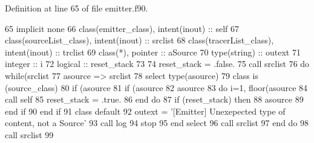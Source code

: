 Definition at line 65 of file emitter.\+f90.


\begin{DoxyCode}
65     \textcolor{keywordtype}{implicit none}
66     \textcolor{keywordtype}{class}(emitter\_class), \textcolor{keywordtype}{intent(inout)} :: self
67     \textcolor{keywordtype}{class}(sourceList\_class), \textcolor{keywordtype}{intent(inout)}  :: srclist
68     \textcolor{keywordtype}{class}(tracerList\_class), \textcolor{keywordtype}{intent(inout)}  :: trclist
69     \textcolor{keywordtype}{class}(*), \textcolor{keywordtype}{pointer} :: aSource
70     \textcolor{keywordtype}{type}(string) :: outext
71     \textcolor{keywordtype}{integer} :: i
72     \textcolor{keywordtype}{logical} :: reset\_stack
73 
74     reset\_stack = .false.
75     \textcolor{keyword}{call }srclist%
76     \textcolor{keywordflow}{do} \textcolor{keywordflow}{while}(srclist%
77         asource => srclist%
78         \textcolor{keywordflow}{select type}(asource)
79 \textcolor{keywordflow}{        class is} (source\_class)
80             \textcolor{keywordflow}{if} (asource%
81                 \textcolor{keywordflow}{if} (asource%
82                 asource%
83                 \textcolor{keywordflow}{do} i=1, floor(asource%
84                     \textcolor{keyword}{call }self%
85                     reset\_stack = .true.                    
86 \textcolor{keywordflow}{                end do} 
87                 \textcolor{keywordflow}{if} (reset\_stack) \textcolor{keywordflow}{then}
88                     asource%
89 \textcolor{keywordflow}{                end if}
90 \textcolor{keywordflow}{            end if}
91 \textcolor{keywordflow}{            class default}
92             outext = \textcolor{stringliteral}{'[Emitter] Unexepected type of content, not a Source'}
93             \textcolor{keyword}{call }log%
94             stop
95 \textcolor{keywordflow}{        end select}
96         \textcolor{keyword}{call }srclist%
97 \textcolor{keywordflow}{    end do}
98     \textcolor{keyword}{call }srclist%
99 
\end{DoxyCode}
\mbox{\label{namespaceemitter__mod_a942679c07927fa594173fdd02da38922}} 
